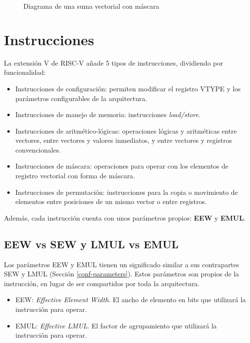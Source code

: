\begin{figure}[H]

\caption {Diagrama de una suma vectorial con máscara}
\label{fig:masked-operation}
\end{figure}

\section{Instrucciones}
La extensión V de RISC-V añade 5 tipos de instrucciones, dividiendo por funcionalidad:

\begin{itemize}
    \item Instrucciones de configuración: permiten modificar el registro VTYPE y los parámetros configurables de la arquitectura.
    \item Instrucciones de manejo de memoria: instrucciones \textit{load/store}.
    \item Instrucciones de aritmético-lógicas: operaciones lógicas y aritméticas entre vectores, entre vectores y valores inmediatos, y entre vectores y registros convencionales.
    \item Instrucciones de máscara: operaciones para operar con los elementos de registro vectorial con forma de máscara.
    \item Instrucciones de permutación: instrucciones para la copia o movimiento de elementos entre posiciones de un mismo vector o entre registros.
\end{itemize}

Además, cada instrucción cuenta con unos parámetros propios: \textbf{EEW} y \textbf{EMUL}.

\subsection{EEW vs SEW y LMUL vs EMUL}
Los parámetros EEW y EMUL tienen un significado similar a sus contrapartes SEW y LMUL (Sección \ref{conf-parameters}). Estos parámetros son propios de la instrucción, en lugar de ser compartidos por toda la arquitectura.
\begin{itemize}
    \item EEW: \textit{Effective Element Width}. El ancho de elemento en bits que utilizará la instrucción para operar.
    \item EMUL: \textit{Effective LMUL}. El factor de agrupamiento que utilizará la instrucción para operar.
\end{itemize}

